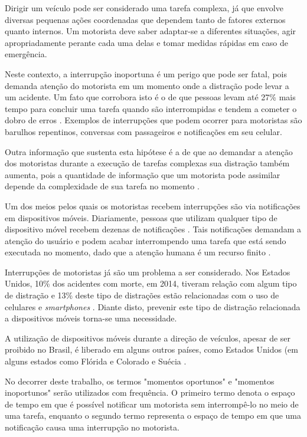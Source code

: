 \label{introducao}

Dirigir um veículo pode ser considerado uma tarefa complexa, já que envolve diversas pequenas ações coordenadas
que dependem tanto de fatores externos quanto internos. Um motorista deve saber adaptar-se a diferentes situações,
agir apropriadamente perante cada uma delas e tomar medidas rápidas em caso de emergência.

Neste contexto, a interrupção inoportuna é um perigo que pode ser fatal, pois demanda atenção do motorista em um momento
onde a distração pode levar a um acidente. Um fato que corrobora isto é o de que pessoas levam até 27\% mais tempo para
concluir uma tarefa quando são interrompidas e tendem a cometer o dobro de erros \cite{bailey2006need}. Exemplos de
interrupções que podem ocorrer para motoristas são barulhos repentinos, conversas com passageiros e notificações em
seu celular.

Outra informação que sustenta esta hipótese é a de que ao demandar a atenção dos motoristas durante a execução de
tarefas complexas sua distração também aumenta, pois a quantidade de informação que um motorista pode assimilar
depende da complexidade de sua tarefa no momento \cite{schneegass2013data}.

Um dos meios pelos quais os motoristas recebem interrupções são via notificações em dispositivos móveis.
Diariamente, pessoas que utilizam qualquer tipo de dispositivo móvel recebem dezenas de notificações
\cite{pielot2014situ}. Tais notificações demandam a atenção do usuário e podem acabar interrompendo uma tarefa que
está sendo executada no momento, dado que a atenção humana é um recurso finito \cite{simon1971designing}.

Interrupções de motoristas já são um problema a ser considerado. Nos Estados Unidos, 10\% dos acidentes com morte, em 2014, tiveram relação
com algum tipo de distração e 13\% deste tipo de distrações estão relacionadas com o uso de celulares e \textit{smartphones}
\cite{distracted2014}. Diante disto, prevenir este tipo de distração relacionada a dispositivos móveis torna-se uma necessidade.

A utilização de dispositivos móveis durante a direção de veículos, apesar de ser proibido no Brasil, é liberado em alguns
outros países, como Estados Unidos (em alguns estados como Flórida e Colorado \cite{cellphoneuse, distracteddriving} e Suécia \cite{swedendrive}.

No decorrer deste trabalho, os termos "momentos oportunos" e "momentos inoportunos" serão utilizados com frequência. O primeiro termo denota
o espaço de tempo em que é possível notificar um motorista sem interrompê-lo no meio de uma tarefa, enquanto o segundo termo representa o
espaço de tempo em que uma notificação causa uma interrupção no motorista.

